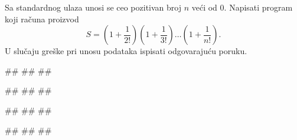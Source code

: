 \begin{Exercise}[difficulty=1, label=p1.7_razno7] 
Sa standardnog ulaza unosi se ceo pozitivan broj $n$ veći od $0$. 
Napisati program koji računa proizvod
$$S = (1 + \frac{1}{2!})(1 + \frac{1}{3!})\ldots(1 +
\frac{1}{n!}).$$ U slučaju greške pri unosu podataka ispisati 
odgovarajuću  poruku.  
  
\begin{miditest}
\begin{upotreba}{1}
#\naslovInt#
##
##
\end{upotreba}
\end{miditest}
\begin{miditest}
\begin{upotreba}{2}
#\naslovInt#
##
##
\end{upotreba}
\end{miditest}

\begin{miditest}
\begin{upotreba}{3}
#\naslovInt#
##
##
\end{upotreba}
\end{miditest}
\begin{miditest}
\begin{upotreba}{4}
#\naslovInt#
##
##
\end{upotreba}
\end{miditest}
\end{Exercise}
\begin{Answer}[ref=p1.7_razno7]
\end{Answer}

